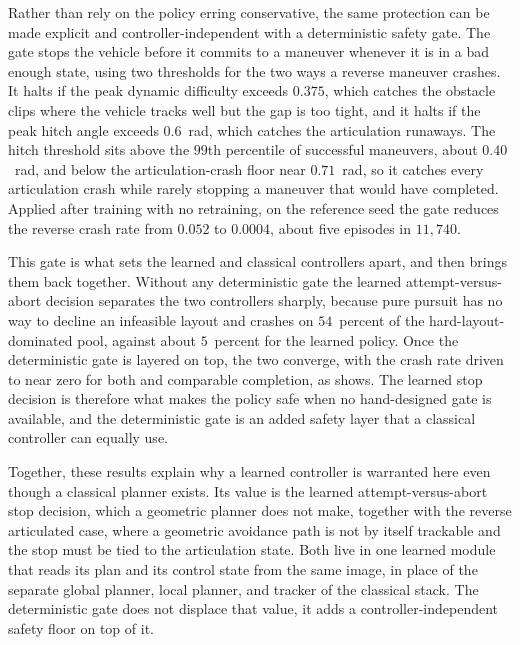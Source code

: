 Rather than rely on the policy erring conservative, the same protection can be made explicit and controller-independent with a deterministic safety gate. The gate stops the vehicle before it commits to a maneuver whenever it is in a bad enough state, using two thresholds for the two ways a reverse maneuver crashes. It halts if the peak dynamic difficulty exceeds $0.375$, which catches the obstacle clips where the vehicle tracks well but the gap is too tight, and it halts if the peak hitch angle exceeds $0.6$~rad, which catches the articulation runaways. The hitch threshold sits above the $99$th percentile of successful maneuvers, about $0.40$~rad, and below the articulation-crash floor near $0.71$~rad, so it catches every articulation crash while rarely stopping a maneuver that would have completed. Applied after training with no retraining, on the reference seed the gate reduces the reverse crash rate from $0.052$ to $0.0004$, about five episodes in $11{,}740$.

This gate is what sets the learned and classical controllers apart, and then brings them back together. Without any deterministic gate the learned attempt-versus-abort decision separates the two controllers sharply, because pure pursuit has no way to decline an infeasible layout and crashes on $54$~percent of the hard-layout-dominated pool, against about $5$~percent for the learned policy. Once the deterministic gate is layered on top, the two converge, with the crash rate driven to near zero for both and comparable completion, as  shows. The learned stop decision is therefore what makes the policy safe when no hand-designed gate is available, and the deterministic gate is an added safety layer that a classical controller can equally use.



Together, these results explain why a learned controller is warranted here even though a classical planner exists. Its value is the learned attempt-versus-abort stop decision, which a geometric planner does not make, together with the reverse articulated case, where a geometric avoidance path is not by itself trackable and the stop must be tied to the articulation state. Both live in one learned module that reads its plan and its control state from the same image, in place of the separate global planner, local planner, and tracker of the classical stack. The deterministic gate does not displace that value, it adds a controller-independent safety floor on top of it.


